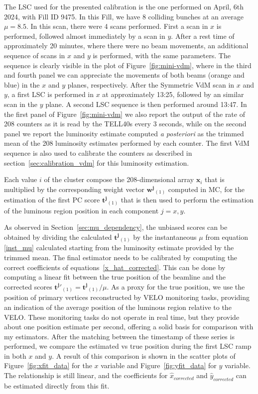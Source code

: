 The LSC used for the presented calibration is the one performed on April, 6th 2024, with Fill ID 9475. In this Fill, we have 8 colliding bunches at an average $\mu=8.5$. In this scan, there were 4 scans performed. First a scan in $x$ is performed, followed almost immediately by a scan in $y$. After a rest time of approximately 20 minutes, where there were no beam movements, an additional sequence of scans in $x$ and $y$ is performed, with the same parameters. The sequence is clearly visible in the plot of Figure~\ref{fig:mini-vdm}, where in the third and fourth panel we can appreciate the movements of both beams (orange and blue) in the $x$ and $y$ planes, respectively. After the Symmetric VdM scan in $x$ and $y$, a first LSC is performed in $x$ at approximately 13:25, followed by an similar scan in the $y$ plane. A second LSC sequence is then performed around 13:47. In the first panel of Figure~\ref{fig:mini-vdm} we also report the output of the rate of 208 counters as it is read by the TELL40s every 3 seconds, while on the second panel we report the luminosity estimate computed \textit{a posteriori} as the trimmed mean of the 208 luminosity estimates performed by each counter. The first VdM sequence is also used to calibrate the counters as described in section~\ref{sec:calibration_vdm} for this luminosity estimation. 

Each value $i$ of the cluster compose the 208-dimensional array $\mathbf{x}_i$ that is multiplied by the corresponding weight vector $\mathbf{w^j}_{(1)}$ computed in MC, for the estimation of the first PC score $\mathbf{t^j}_{(1)}$ that is then used to perform the estimation of the luminous region position in each component $j=x,y$. 

As observed in Section~\ref{sec:mu_dependency}, the unbiased scores can be obtained by dividing the calculated $\mathbf{t^j}_{(1)}$ by the instantaneous $\mu$ from equation \eqref{inst_mu} calculated starting from the luminosity estimate provided by the trimmed mean.
The final estimator needs to be calibrated by computing the correct coefficients of equations~\ref{x_hat_corrected}. This can be done by computing a linear fit between the true position of the beamline and the corrected scores $\mathbf{t^j}'_{(1)}=\mathbf{t^j}_{(1)}/\mu$. As a proxy for the true position, we use the position of primary vertices reconstructed by VELO monitoring tasks, providing an indication of the average position of the luminous region relative to the VELO. These monitoring tasks do not operate in real time, but they provide about one position estimate per second, offering a solid basis for comparison with my estimators. After the matching between the timestamp of these series is performed, we compare the estimated vs true position during the first LSC ramp in both $x$ and $y$. A result of this comparison is shown in the scatter plots of Figure~\ref{fig:xfit_data} for the $x$ variable and Figure~\ref{fig:yfit_data} for $y$ variable. The relationship is still linear, and the coefficients for $\hat{x}_{corrected}$ and $\hat{y}_{corrected}$ can be estimated directly from this fit.

